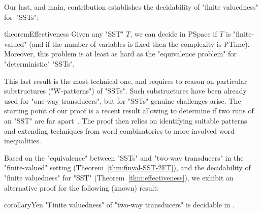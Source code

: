 \documentclass{theoretics}
\newcommand{\RestateRemark}[1]{{\normalfont\bfseries #1}}
\newcommand{\RestateInit}[1]{\newcommand{#1}{}}
\begin{document}
    Our last, and main, contribution establishes the decidability
    of "finite valuedness" for~"SSTs":%


\RestateInit{\restateEffectiveness}
\begin{restatable}{theorem}{Effectiveness}
	\label{thm:effectiveness}\RestateRemark{\restateEffectiveness}
      Given any "SST" $T$, we can decide in {\upshape\sc PSpace}
      if $T$ is
      "finite-valued" (and if the number of variables
      is fixed then the complexity is {\upshape\sc PTime}). 
      Moreover, this problem is at least as hard as the
      "equivalence problem" for "deterministic" "SSTs". 
    \end{restatable}

    This last result is the most technical one, and requires to reason
    on particular substructures ("W-patterns") of "SSTs".
    Such substructures %
    have  been already  used for "one-way transducers", 
    but for "SSTs" genuine challenges arise.
    The starting point of our  proof is a
    recent result allowing to determine if two runs of
    an "SST" are
    far apart~\cite{SSTdelay}.
    The proof then relies on identifying suitable patterns and
    extending techniques from word combinatorics to more involved
    word inequalities. 
    



    Based on the "equivalence" between "SSTs" and "two-way transducers" in the
    "finite-valued" setting (Theorem~\ref{thm:finval-SST-2FT}), and the
    decidability of "finite valuedness" for "SST"
    (Theorem~\ref{thm:effectiveness}), we exhibit 
    an alternative proof for the following (known)
    result:

  
    \RestateInit{\restateYen}
\begin{restatable}{corollary}{Yen}
	  \label{thm:finval-twoway}\RestateRemark{\restateYen}
      "Finite valuedness" of "two-way transducers" is decidable in .
    \end{restatable}
\end{document}
